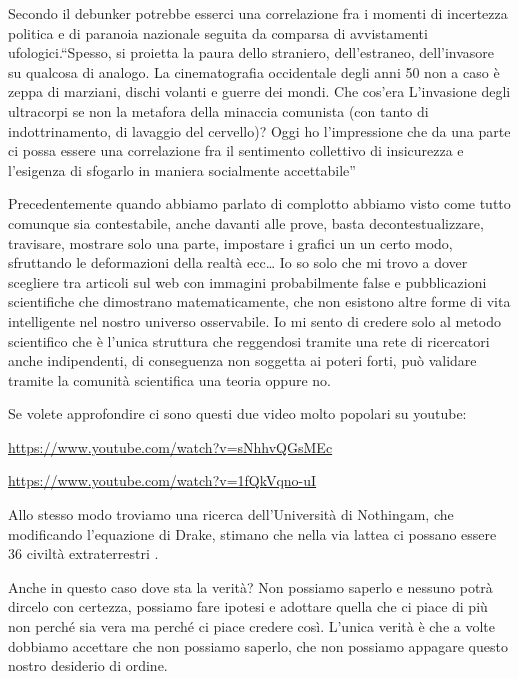 \documentclass[12pt]{book} %
\begin{document}
\begin{mdframed}[linewidth=1pt]
\bigskip

Secondo il debunker potrebbe esserci una correlazione fra i momenti di incertezza politica e di paranoia nazionale
seguita da comparsa di avvistamenti ufologici.“Spesso, si proietta la paura dello straniero,
dell'estraneo, dell'invasore su qualcosa di analogo. La cinematografia
occidentale degli anni 50 non a caso è zeppa di marziani, dischi volanti e guerre dei mondi. Che
cos'era L'invasione degli ultracorpi se non la metafora della minaccia
comunista (con tanto di indottrinamento, di lavaggio del cervello)? Oggi ho l'impressione che da
una parte ci possa essere una correlazione fra il sentimento collettivo di insicurezza e
l'esigenza di sfogarlo in maniera socialmente
accettabile”


\bigskip

Precedentemente quando abbiamo parlato di complotto abbiamo visto come tutto comunque sia contestabile, anche davanti
alle prove, basta decontestualizzare, travisare, mostrare solo una parte, impostare i grafici un un certo modo,
sfruttando le deformazioni della realtà ecc… Io so solo che mi trovo a dover scegliere tra articoli sul web con
immagini probabilmente false e pubblicazioni scientifiche che dimostrano matematicamente, che non esistono altre forme
di vita intelligente nel nostro universo osservabile. Io mi sento di credere solo al metodo scientifico che è
l'unica struttura che reggendosi tramite una rete di ricercatori anche indipendenti, di
conseguenza non soggetta ai poteri forti, può validare tramite la comunità scientifica una teoria oppure
no.


\bigskip

Se volete approfondire ci sono questi due video molto popolari su youtube:

\url{https://www.youtube.com/watch?v=sNhhvQGsMEc}

\url{https://www.youtube.com/watch?v=1fQkVqno-uI}


\bigskip

Allo stesso modo troviamo una ricerca dell'Università di Nothingam, che modificando
l'equazione di Drake, stimano che nella via lattea ci possano essere 36 civiltà
extraterrestri
.

Anche in questo caso dove sta la verità? Non possiamo saperlo e nessuno potrà dircelo con certezza, possiamo fare
ipotesi e adottare quella che ci piace di più non perché sia vera ma perché ci piace credere così.
L'unica verità è che a volte dobbiamo accettare che non possiamo saperlo, che non possiamo
appagare questo nostro desiderio di ordine.
\end{mdframed}
\end{document}
